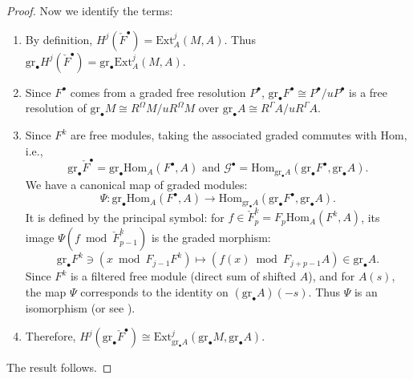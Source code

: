 \begin{proof}
    Now we identify the terms:
    \begin{enumerate}
        \item By definition, $H^j(\check{F}^{\bullet}) = \mathrm{Ext}_A^j(M, A)$. Thus $\mathrm{gr}_{\bullet}H^j(\check{F}^{\bullet}) = \mathrm{gr}_{\bullet}\mathrm{Ext}_A^j(M, A)$.
        \item Since $F^\bullet$ comes from a graded free resolution $P^\bullet$, $\mathrm{gr}_{\bullet} F^{\bullet} \cong P^\bullet / u P^\bullet$ is a free resolution of $\mathrm{gr}_{\bullet} M \cong R^\Omega M / u R^\Omega M$ over $\mathrm{gr}_{\bullet} A \cong R^\Gamma A / u R^\Gamma A$.
        \item Since $F^k$ are free modules, taking the associated graded commutes with $\mathrm{Hom}$, i.e.,
              \[
                  \mathrm{gr}_{\bullet}\check{F}^{\bullet} = \mathrm{gr}_{\bullet}\mathrm{Hom}_A(F^{\bullet}, A) \text{ and } \mathcal{G}^{\bullet} = \mathrm{Hom}_{\mathrm{gr}_{\bullet}A}(\mathrm{gr}_{\bullet}F^{\bullet}, \mathrm{gr}_{\bullet}A).
              \]
              We have a canonical map of graded modules:
              \[ \Psi: \mathrm{gr}_{\bullet}\mathrm{Hom}_A(F^{\bullet}, A) \longrightarrow \mathrm{Hom}_{\mathrm{gr}_{\bullet}A}(\mathrm{gr}_{\bullet}F^{\bullet}, \mathrm{gr}_{\bullet}A). \]
              It is defined by the principal symbol: for $f \in \check{F}^k_p = F_p\mathrm{Hom}_A(F^k, A)$, its image $\Psi(f \bmod \check{F}^k_{p-1})$ is the graded morphism:
              \[
                  \mathrm{gr}_{\bullet}F^k \ni (x \bmod F_{j-1}F^k) \longmapsto (f(x) \bmod F_{j+p-1}A) \in \mathrm{gr}_{\bullet}A.
              \]
              Since $F^k$ is a filtered free module (direct sum of shifted $A$), and for $A(s)$, the map $\Psi$ corresponds to the identity on $(\mathrm{gr}_{\bullet}A)(-s)$. Thus $\Psi$ is an isomorphism (or see \cite[Lemma~D.2.3]{hotta2008d}).
        \item Therefore, $H^j(\mathrm{gr}_{\bullet}\check{F}^{\bullet}) \cong \mathrm{Ext}_{\mathrm{gr}_{\bullet}A}^j(\mathrm{gr}_{\bullet}M, \mathrm{gr}_{\bullet}A).$
    \end{enumerate}
    The result follows.
\end{proof}

